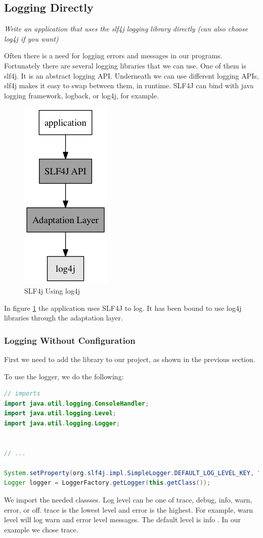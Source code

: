 \subsection{Logging Directly}
\textit{Write an application that uses the slf4j logging library directly (can also choose log4j if you want)}

Often there is a need for logging errors and messages in our programs. Fortunately there are several logging libraries that we can use. One of them is slf4j. It is an abstract logging API. Underneath we can use different logging APIs, slf4j makes it easy to swap between them, in runtime. SLF4J can bind with java logging framework, logback, or log4j, for example. \cite{slf4j}

\begin{figure}[H]\centering
\includegraphics{slf4j.png}
\caption{SLF4j Using log4j}
\label{fig:slf4jlog4j}
\end{figure}

In figure \ref{fig:slf4jlog4j} the application uses SLF4J to log. It has been bound to use log4j libraries through the adaptation layer.

\subsubsection{Logging Without Configuration}

First we need to add the library to our project, as shown in the previous section.

To use the logger, we do the following:

\begin{lstlisting}[language=Java]
// imports
import java.util.logging.ConsoleHandler;
import java.util.logging.Level;
import java.util.logging.Logger;


// ...

System.setProperty(org.slf4j.impl.SimpleLogger.DEFAULT_LOG_LEVEL_KEY, "TRACE");
Logger logger = LoggerFactory.getLogger(this.getClass());
\end{lstlisting}
We import the needed classses. Log level can be one of trace, debug, info, warn, error, or off. trace is the lowest level and error is the highest. For example, warn level will log warn and error level messages. The default level is info \cite{simplelogger}. In our example we chose trace.

